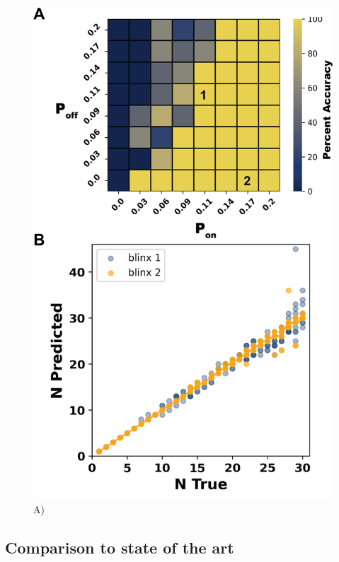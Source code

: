 \begin{figure}[ht]
  \includegraphics[width=\linewidth]{figures/kinetic_regime}
  \caption{A) }
  \label{fig:results:regime}
\end{figure}

\subsection{Comparison to state of the art \lbfcs}

